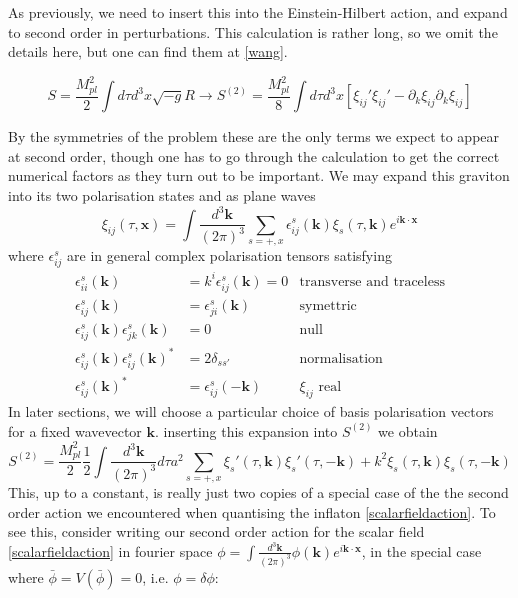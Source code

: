 \documentclass[a4paper,10pt]{article}
\renewcommand{\v}[1]{\mathbf{#1}}
\newcommand{\Mp}{M_{pl}}
\newcommand{\half}{\frac{1}{2}}
\newcommand{\bphi}{\bar{\phi}}
\newcommand{\fint}[1]{\int \frac{d^3 \v{#1}}{(2\pi)^3}}
\begin{document}
As previously, we need to insert this into the Einstein-Hilbert action, and expand to second order in perturbations. This calculation is rather long, so we omit the details here, but one can find them at \ref{wang}. 

\begin{equation}
S=\frac{\Mp^2}{2} \int d\tau d^3x \sqrt{-g}R \rightarrow S^{(2)} = \frac{\Mp^2}{8}\int d\tau d^3x [\xi_{ij}'\xi_{ij}'-\partial_k\xi_{ij}\partial_k\xi_{ij}]
\end{equation}

By the symmetries of the problem these are the only terms we expect to appear at second order, though one has to go through the calculation to get the correct numerical factors as they turn out to be important. We may expand this graviton into its two polarisation states and as plane waves
\begin{equation}
\xi_{ij}(\tau, \v{x}) = \fint{k} \sum_{s=+,x} \epsilon_{ij}^s(\v{k})\xi_s(\tau,\v{k})e^{i\v{k}\cdot\v{x}}
\end{equation}
where $\epsilon_{ij}^s$ are in general complex polarisation tensors satisfying
\begin{align}
\epsilon_{ii}^s(\v{k}) &= k^i \epsilon_{ij}^s(\v{k}) = 0 &\text{transverse and traceless}\\
\label{polarisation1}
\epsilon_{ij}^s(\v{k}) &= \epsilon_{ji}^s(\v{k}) &\text{symettric}\\
\epsilon_{ij}^s(\v{k})\epsilon_{jk}^s(\v{k}) &= 0&\text{null}\\
\epsilon_{ij}^s(\v{k})\epsilon_{ij}^s(\v{k})^* &= 2\delta_{ss'} &\text{normalisation}\\
\epsilon_{ij}^s(\v{k})^* &= \epsilon_{ij}^s(\v{-k})&\text{$\xi_{ij}$ real}
\label{polarisation2}
\end{align}
In later sections, we will choose a particular choice of basis polarisation vectors for a fixed wavevector $\v{k}$. inserting this expansion into $S^{(2)}$ we obtain 
\begin{equation}
S^{(2)} = \frac{\Mp^2}{2} \half \fint{k} d\tau a^2 \sum_{s=+,x} \xi_s'(\tau,\v{k})\xi_s '(\tau,\v{-k})+k^2 \xi_s(\tau,\v{k})\xi_s (\tau,\v{-k})
\label{gravwaveaction}
\end{equation}
This, up to a constant, is really just two copies of a special case of the the second order action we encountered when quantising the inflaton \ref{scalarfieldaction}. To see this, consider writing our second order action for the scalar field \ref{scalarfieldaction} in fourier space $\phi = \fint{k} \phi(\v{k})e^{i\v{k}\cdot\v{x}}$, in the special case where $\bphi = V(\bphi) = 0$, i.e. $\phi = \delta \phi$:
\end{document}
